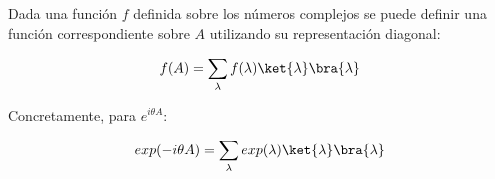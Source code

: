 Dada una función $f$ definida sobre los números complejos se puede definir una función correspondiente sobre $A$ utilizando su representación diagonal:

\begin{align*}
  f(A) = \sum_\lambda f(\lambda) \ket{\lambda}\bra{\lambda}
\end{align*}

Concretamente, para $e^{i \theta A}$:

\begin{align*}
   exp( -i \theta A) = \sum_\lambda exp(\lambda) \ket{\lambda}\bra{\lambda}
\end{align*}

